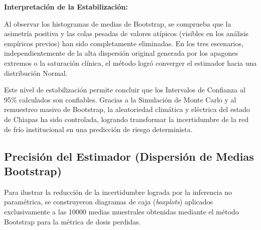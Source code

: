 \documentclass[
  spanish,
  us-letterpaper,
]{scrreprt}
\numberwithin{equation}{section}
\theoremstyle{plain}
\theoremstyle{plain}
\theoremstyle{plain}
\theoremstyle{definition}
\theoremstyle{remark}
\begin{document}
\textbf{Interpretación de la Estabilización:}

Al observar los histogramas de medias de Bootstrap, se comprueba que la
asimetría positiva y las colas pesadas de valores atípicos (visibles en
los análisis empíricos previos) han sido completamente eliminadas. En
los tres escenarios, independientemente de la alta dispersión original
generada por los apagones extremos o la saturación clínica, el método
logró converger el estimador hacia una distribución Normal.

Este nivel de estabilización permite concluir que los Intervalos de
Confianza al 95\% calculados son confiables. Gracias a la Simulación de
Monte Carlo y al remuestreo masivo de Bootstrap, la aleatoriedad
climática y eléctrica del estado de Chiapas ha sido controlada, logrando
transformar la incertidumbre de la red de frío institucional en una
predicción de riesgo determinista.

\subsection{Precisión del Estimador (Dispersión de Medias
Bootstrap)}\label{precisiuxf3n-del-estimador-dispersiuxf3n-de-medias-bootstrap}

Para ilustrar la reducción de la incertidumbre lograda por la inferencia
no paramétrica, se construyeron diagramas de caja (\emph{boxplots})
aplicados exclusivamente a las 10000 medias muestrales obtenidas
mediante el método Bootstrap para la métrica de dosis perdidas.
\end{document}
